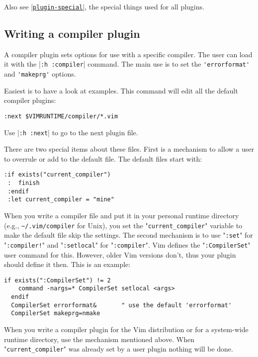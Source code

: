 Also see \hyperref[plugin-special]{|\texttt{plugin-special}|}, the special things used for all plugins.
\subsection{Writing a compiler plugin}
\label{write-compiler-plugin}
A compiler plugin sets options for use with a specific compiler.
The user can load it with the |\verb!:h :compiler!| command.
The main use is to set the \verb!'errorformat'! and \verb!'makeprg'! options.

Easiest is to have a look at examples.
This command will edit all the default compiler plugins:

\begin{Verbatim}[samepage=true]
 :next $VIMRUNTIME/compiler/*.vim
\end{Verbatim}

Use |\verb!:h :next!| to go to the next plugin file.

There are two special items about these files.
First is a mechanism to allow a user to overrule or add to the default file.
The default files start with:

\begin{Verbatim}[samepage=true]
 :if exists("current_compiler")
 :  finish
 :endif
 :let current_compiler = "mine"
\end{Verbatim}

When you write a compiler file and put it in your personal runtime directory (e.g., \verb!~/.vim/compiler! for Unix), you set the "\verb!current_compiler!" variable to make the default file skip the settings.
\label{:CompilerSet}
The second mechanism is to use "\verb!:set!" for "\verb_:compiler!_" and "\verb!:setlocal!" for "\verb!:compiler!".
Vim defines the "\verb!:CompilerSet!" user command for this.
However, older Vim versions don't, thus your plugin should define it then.
This is an example:

\begin{Verbatim}[samepage=true]
  if exists(":CompilerSet") != 2
    command -nargs=* CompilerSet setlocal <args>
  endif
  CompilerSet errorformat&       " use the default 'errorformat'
  CompilerSet makeprg=nmake
\end{Verbatim}

When you write a compiler plugin for the Vim distribution or for a system-wide runtime directory, use the mechanism mentioned above.
When "\verb!current_compiler!" was already set by a user plugin nothing will be done.

